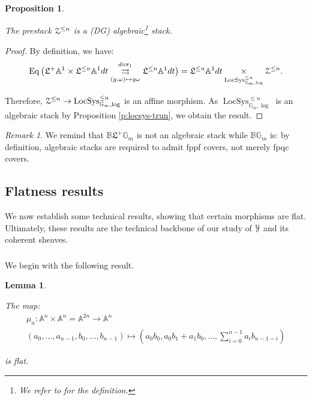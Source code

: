 \documentclass[reqno,11pt]{amsart}
\numberwithin{equation}{subsection}
\newtheorem{lem}[thm]{Lemma}
\newtheorem{prop}[thm]{Proposition}
\theoremstyle{remark}
\newtheorem{rem}[thm]{Remark}
\newcommand{\bA}{{\mathbb A}}
\newcommand{\bB}{{\mathbb B}}
\newcommand{\bG}{{\mathbb G}}
\newcommand{\sY}{{\EuScript Y}}
\newcommand{\sZ}{{\EuScript Z}}
\newcommand{\fL}{{\mathfrak L}}
\newcommand{\on}{\operatorname}
\newcommand{\LocSys}{\on{LocSys}}
\begin{document}
\begin{prop}\label{p:zn-algebraic}

The prestack $\sZ^{\leq n}$ is a (DG) algebraic\footnote{We refer to
\cite{dennis-dag} for the definition.} stack.

\end{prop}

\begin{proof}

By definition, we have:
%
\[
\on{Eq}\big(\fL^+ \bA^1 \times \fL^{\leq n} \bA^1 dt 
\underset{(g,\omega) \mapsto g\omega}{\overset{d\circ \pi_1}{\rightrightarrows}}
\fL^{\leq n} \bA^1 dt\big) = 
\fL^{\leq n} \bA^1 dt \underset{\LocSys_{\bG_m,\log}^{\leq n}}{\times} 
\sZ^{\leq n}.
\]

\noindent Therefore, $\sZ^{\leq n} \to \LocSys_{\bG_m,\log}^{\leq n}$ is
an affine morphism. As $\LocSys_{\bG_m,\log}^{\leq n}$ is an algebraic stack
by Proposition \ref{p:locsys-trun}, we obtain the result.

\end{proof}

\begin{rem}

We remind that $\bB \fL^+ \bG_m$ is not an algebraic stack
while $\bB \bG_m$ is: by definition, algebraic stacks are required
to admit fppf covers, not merely fpqc covers. 

\end{rem}

\subsection{Flatness results}\label{ss:flatness}

We now establish some technical results, showing that certain morphisms
are flat. Ultimately, these results are the technical backbone of
our study of $\sY$ and its coherent sheaves.

\subsubsection{}

We begin with the following result.

\begin{lem}\label{l:flat-mult}

The map:
%
\[
\begin{gathered}
\mu_n:\bA^n \times \bA^n = \bA^{2n} \to \bA^n \\
(a_0,\ldots,a_{n-1},b_0,\ldots,b_{n-1}) \mapsto 
(a_0b_0,a_0b_1+a_1b_0,\ldots,\sum_{i = 0}^{n-1} a_ib_{n-1-i})
\end{gathered}
\]

\noindent is flat.

\end{lem}
\end{document}
